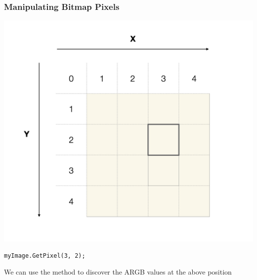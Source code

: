 \begin{frame}[fragile]
	\frametitle{Manipulating Bitmap Pixels}
\begin{center}
	\includegraphics[scale=0.2]{pixel_coordinates}	
\end{center}
	\begin{lstlisting}
myImage.GetPixel(3, 2);
	\end{lstlisting}
	We can use the method to discover the ARGB values at the above position

\end{frame}